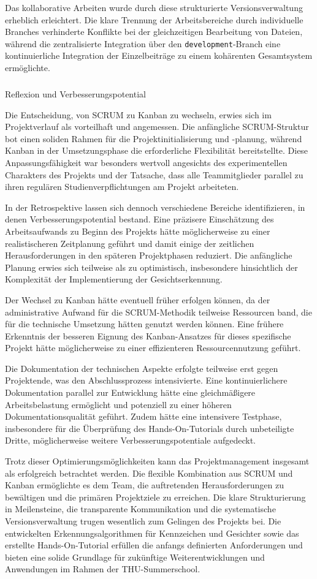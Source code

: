 Das kollaborative Arbeiten wurde durch diese strukturierte Versionsverwaltung erheblich erleichtert. Die klare Trennung der Arbeitsbereiche durch individuelle Branches verhinderte Konflikte bei der gleichzeitigen Bearbeitung von Dateien, während die zentralisierte Integration über den \texttt{development}-Branch eine kontinuierliche Integration der Einzelbeiträge zu einem kohärenten Gesamtsystem ermöglichte.

\subparagraph{}{Reflexion und Verbesserungspotential}

Die Entscheidung, von SCRUM zu Kanban zu wechseln, erwies sich im Projektverlauf als vorteilhaft und angemessen. Die anfängliche SCRUM-Struktur bot einen soliden Rahmen für die Projektinitialisierung und -planung, während Kanban in der Umsetzungsphase die erforderliche Flexibilität bereitstellte. Diese Anpassungsfähigkeit war besonders wertvoll angesichts des experimentellen Charakters des Projekts und der Tatsache, dass alle Teammitglieder parallel zu ihren regulären Studienverpflichtungen am Projekt arbeiteten.

In der Retrospektive lassen sich dennoch verschiedene Bereiche identifizieren, in denen Verbesserungspotential bestand. Eine präzisere Einschätzung des Arbeitsaufwands zu Beginn des Projekts hätte möglicherweise zu einer realistischeren Zeitplanung geführt und damit einige der zeitlichen Herausforderungen in den späteren Projektphasen reduziert. Die anfängliche Planung erwies sich teilweise als zu optimistisch, insbesondere hinsichtlich der Komplexität der Implementierung der Gesichtserkennung.

Der Wechsel zu Kanban hätte eventuell früher erfolgen können, da der administrative Aufwand für die SCRUM-Methodik teilweise Ressourcen band, die für die technische Umsetzung hätten genutzt werden können. Eine frühere Erkenntnis der besseren Eignung des Kanban-Ansatzes für dieses spezifische Projekt hätte möglicherweise zu einer effizienteren Ressourcennutzung geführt.

Die Dokumentation der technischen Aspekte erfolgte teilweise erst gegen Projektende, was den Abschlussprozess intensivierte. Eine kontinuierlichere Dokumentation parallel zur Entwicklung hätte eine gleichmäßigere Arbeitsbelastung ermöglicht und potenziell zu einer höheren Dokumentationsqualität geführt. Zudem hätte eine intensivere Testphase, insbesondere für die Überprüfung des Hands-On-Tutorials durch unbeteiligte Dritte, möglicherweise weitere Verbesserungspotentiale aufgedeckt.

Trotz dieser Optimierungsmöglichkeiten kann das Projektmanagement insgesamt als erfolgreich betrachtet werden. Die flexible Kombination aus SCRUM und Kanban ermöglichte es dem Team, die auftretenden Herausforderungen zu bewältigen und die primären Projektziele zu erreichen. Die klare Strukturierung in Meilensteine, die transparente Kommunikation und die systematische Versionsverwaltung trugen wesentlich zum Gelingen des Projekts bei. Die entwickelten Erkennungsalgorithmen für Kennzeichen und Gesichter sowie das erstellte Hands-On-Tutorial erfüllen die anfangs definierten Anforderungen und bieten eine solide Grundlage für zukünftige Weiterentwicklungen und Anwendungen im Rahmen der THU-Summerschool.